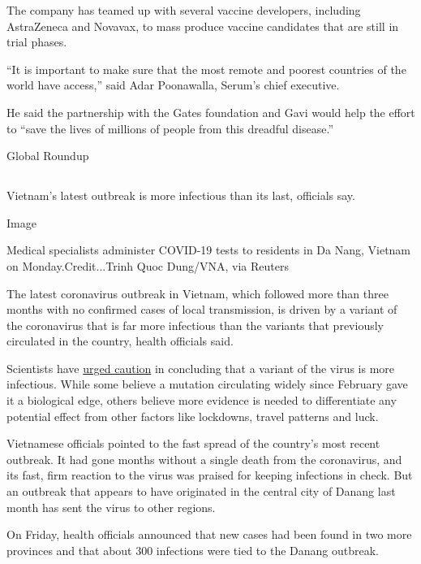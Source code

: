 The company has teamed up with several vaccine developers, including
AstraZeneca and Novavax, to mass produce vaccine candidates that are
still in trial phases.

``It is important to make sure that the most remote and poorest
countries of the world have access,'' said Adar Poonawalla, Serum's
chief executive.

He said the partnership with the Gates foundation and Gavi would help
the effort to ``save the lives of millions of people from this dreadful
disease.''

Global Roundup

\hypertarget{section-6}{%
\subsection{}\label{section-6}}

Vietnam's latest outbreak is more infectious than its last, officials
say.

Image

Medical specialists administer COVID-19 tests to residents in Da Nang,
Vietnam on Monday.Credit...Trinh Quoc Dung/VNA, via Reuters

The latest coronavirus outbreak in Vietnam, which followed more than
three months with no confirmed cases of local transmission, is driven by
a variant of the coronavirus that is far more infectious than the
variants that previously circulated in the country, health officials
said.

Scientists have
\href{https://www.nytimes3xbfgragh.onion/2020/06/12/science/coronavirus-mutation-genetics-spike.html}{urged
caution} in concluding that a variant of the virus is more infectious.
While some believe a mutation circulating widely since February gave it
a biological edge, others believe more evidence is needed to
differentiate any potential effect from other factors like lockdowns,
travel patterns and luck.

Vietnamese officials pointed to the fast spread of the country's most
recent outbreak. It had gone months without a single death from the
coronavirus, and its fast, firm reaction to the virus was praised for
keeping infections in check. But an outbreak that appears to have
originated in the central city of Danang last month has sent the virus
to other regions.

On Friday, health officials announced that new cases had been found in
two more provinces and that about 300 infections were tied to the Danang
outbreak.


